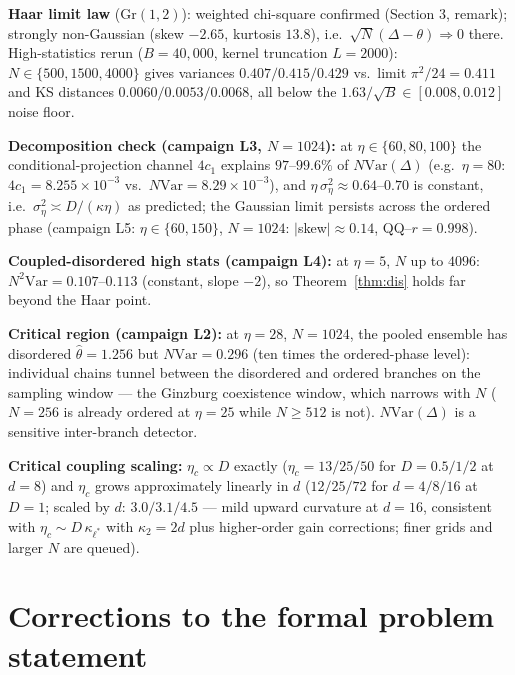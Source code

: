 \documentclass[11pt]{article}
\theoremstyle{definition}
\newcommand{\Gr}{\mathrm{Gr}}
\newcommand{\Var}{\mathrm{Var}}
\begin{document}
\textbf{Haar limit law} ($\Gr(1,2)$): weighted chi-square confirmed
(Section 3, remark); strongly non-Gaussian (skew $-2.65$, kurtosis $13.8$), i.e.\
$\sqrt N(\Delta-\theta)\Rightarrow0$ there. High-statistics rerun ($B=40{,}000$,
kernel truncation $L=2000$): $N\in\{500,1500,4000\}$ gives variances
$0.407/0.415/0.429$ vs.\ limit $\pi^2/24=0.411$ and KS distances
$0.0060/0.0053/0.0068$, all below the $1.63/\sqrt B\in[0.008,0.012]$ noise floor.

\textbf{Decomposition check (campaign L3, $N=1024$):} at $\eta\in\{60,80,100\}$ the
conditional-projection channel $4c_1$ explains $97$--$99.6\%$ of $N\Var(\Delta)$
(e.g.\ $\eta=80$: $4c_1=8.255\times10^{-3}$ vs.\ $N\Var=8.29\times10^{-3}$), and
$\eta\,\sigma_\eta^2\approx0.64$--$0.70$ is constant, i.e.\
$\sigma_\eta^2\asymp D/(\kappa\eta)$ as predicted; the Gaussian limit persists
across the ordered phase (campaign L5: $\eta\in\{60,150\}$, $N=1024$:
$|$skew$|\approx0.14$, QQ--$r=0.998$).

\textbf{Coupled-disordered high stats (campaign L4):} at $\eta=5$, $N$ up to $4096$:
$N^2\Var=0.107$--$0.113$ (constant, slope $-2$), so Theorem~\ref{thm:dis} holds
far beyond the Haar point.

\textbf{Critical region (campaign L2):} at $\eta=28$, $N=1024$, the pooled ensemble
has disordered $\hat\theta=1.256$ but $N\Var=0.296$ (ten times the ordered-phase
level): individual chains tunnel between the disordered and ordered branches on the
sampling window --- the Ginzburg coexistence window, which narrows with $N$
($N=256$ is already ordered at $\eta=25$ while $N\ge512$ is not). $N\Var(\Delta)$ is
a sensitive inter-branch detector.

\textbf{Critical coupling scaling:} $\eta_c\propto D$ exactly
($\eta_c=13/25/50$ for $D=0.5/1/2$ at $d=8$) and $\eta_c$ grows approximately
linearly in $d$ ($12/25/72$ for $d=4/8/16$ at $D=1$; scaled by $d$: $3.0/3.1/4.5$
--- mild upward curvature at $d=16$, consistent with $\eta_c\sim D\,\kappa_{\ell^*}$
with $\kappa_2=2d$ plus higher-order gain corrections; finer grids and larger $N$
are queued).

\section{Corrections to the formal problem statement}
\end{document}
